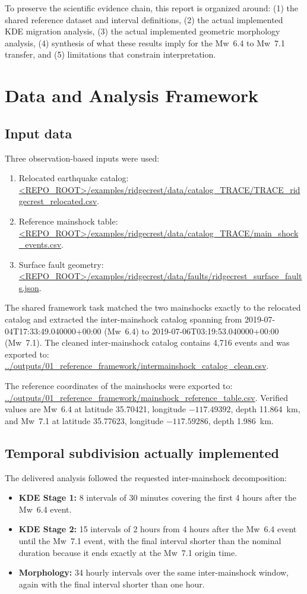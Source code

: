 \documentclass[11pt]{article}
\begin{document}
To preserve the scientific evidence chain, this report is organized around: (1) the shared reference dataset and interval definitions, (2) the actual implemented KDE migration analysis, (3) the actual implemented geometric morphology analysis, (4) synthesis of what these results imply for the Mw~6.4 to Mw~7.1 transfer, and (5) limitations that constrain interpretation.

\section{Data and Analysis Framework}
\subsection{Input data}
Three observation-based inputs were used:
\begin{enumerate}[leftmargin=*]
    \item Relocated earthquake catalog: \url{<REPO_ROOT>/examples/ridgecrest/data/catalog_TRACE/TRACE_ridgecrest_relocated.csv}.
    \item Reference mainshock table: \url{<REPO_ROOT>/examples/ridgecrest/data/catalog_TRACE/main_shock_events.csv}.
    \item Surface fault geometry: \url{<REPO_ROOT>/examples/ridgecrest/data/faults/ridgecrest_surface_faults.json}.
\end{enumerate}

The shared framework task matched the two mainshocks exactly to the relocated catalog and extracted the inter-mainshock catalog spanning from 2019-07-04T17:33:49.040000+00:00 (Mw~6.4) to 2019-07-06T03:19:53.040000+00:00 (Mw~7.1). The cleaned inter-mainshock catalog contains 4,716 events and was exported to:
\url{../outputs/01_reference_framework/intermainshock_catalog_clean.csv}.

The reference coordinates of the mainshocks were exported to:
\url{../outputs/01_reference_framework/mainshock_reference_table.csv}.
Verified values are Mw~6.4 at latitude 35.70421, longitude $-117.49392$, depth 11.864~km, and Mw~7.1 at latitude 35.77623, longitude $-117.59286$, depth 1.986~km.

\subsection{Temporal subdivision actually implemented}
The delivered analysis followed the requested inter-mainshock decomposition:
\begin{itemize}[leftmargin=*]
    \item \textbf{KDE Stage 1:} 8 intervals of 30 minutes covering the first 4 hours after the Mw~6.4 event.
    \item \textbf{KDE Stage 2:} 15 intervals of 2 hours from 4 hours after the Mw~6.4 event until the Mw~7.1 event, with the final interval shorter than the nominal duration because it ends exactly at the Mw~7.1 origin time.
    \item \textbf{Morphology:} 34 hourly intervals over the same inter-mainshock window, again with the final interval shorter than one hour.
\end{itemize}
\end{document}
